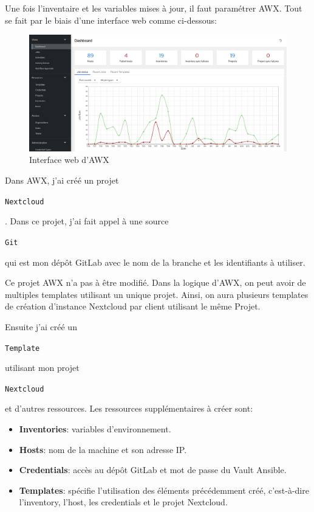 \documentclass[12pt, a4paper, twoside]{article}
\begin{document}
Une fois l'inventaire et les variables mises à jour, il faut paramétrer AWX. 
Tout se fait par le biais d'une interface web comme ci-dessous:
\begin{figure}[!ht]
    \centering
    \includegraphics[width=\textwidth]{src/interface_awx.png}
    \caption{Interface web d'AWX}
    \label{fig:awx}
\end{figure}

Dans AWX, j'ai créé un projet \begin{code}\texttt{\gls{Nextcloud}}\end{code}. 
Dans ce projet, j'ai fait appel à une source \begin{code}\texttt{Git}\end{code} qui est mon dépôt \gls{GitLab} avec le nom de la branche et les identifiants à utiliser. 

Ce projet AWX n'a pas à être modifié.
Dans la logique d'AWX, on peut avoir de multiples templates utilisant un unique projet.
Ainsi, on aura plusieurs templates de création d'instance \gls{Nextcloud} par client utilisant le même Projet.

Ensuite j'ai créé un \begin{code}\texttt{Template}\end{code} utilisant mon projet \begin{code}\texttt{\gls{Nextcloud}}\end{code} et d'autres ressources. 
Les ressources supplémentaires à créer sont:
\begin{itemize}
    \item \textbf{Inventories}: variables d'environnement. 
    \item \textbf{Hosts}: nom de la machine et son adresse \gls{IP}.
    \item \textbf{Credentials}:  accès au dépôt \gls{GitLab} et mot de passe du Vault \gls{Ansible}.
    \item \textbf{Templates}: spécifie l'utilisation des éléments précédemment créé, c'est-à-dire l'inventory, l'host, les credentials et le projet \gls{Nextcloud}.
\end{itemize}
\end{document}
